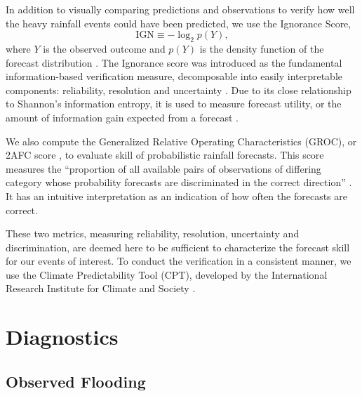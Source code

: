 \documentclass[twocol]{ametsoc}
\begin{document}
In addition to visually comparing predictions and observations to verify how well the heavy rainfall events could have been predicted, we use the Ignorance Score,
\begin{equation}\label{eq:ignorance}
	\text{IGN} \equiv - \log_2 p(Y),
\end{equation}
where $Y$ is the observed outcome and $p(Y)$ is the density function of the forecast distribution \citep{Good:1952ux,Roulston:2002jz,Brocker:2007er}.
The Ignorance score was introduced as the fundamental information-based verification measure,  decomposable into easily interpretable components: reliability, resolution and uncertainty \citep{Weijs:2010cl}.
Due to its close relationship to Shannon's information entropy, it is used to measure forecast utility, or the amount of information gain expected from a forecast \citep{Roulston:2002jz}.

We also compute the Generalized Relative Operating Characteristics (GROC), or 2AFC score \citep{Mason:2009kr}, to evaluate skill of probabilistic rainfall forecasts.
This score measures the ``proportion of all available pairs of observations of differing category whose probability forecasts are discriminated in the correct direction'' \citep{Mason:2009kr}.
It has an intuitive interpretation as an indication of how often the forecasts are correct.

These two metrics, measuring reliability, resolution, uncertainty and discrimination, are deemed here to be sufficient to characterize the forecast skill for our events of interest.
To conduct the verification in a consistent manner, we use the Climate Predictability Tool (CPT), developed by the International Research Institute for Climate and Society \citep{Mason:2017gg}.


\section{Diagnostics} \label{sec:diagnostics}


\subsection{Observed Flooding} \label{sec:flood}
\end{document}
